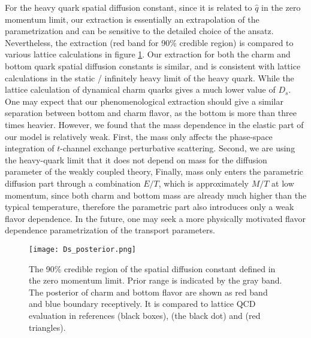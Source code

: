 For the heavy quark spatial diffusion constant, since it is related to $\hat{q}$ in the zero momentum limit, our extraction is essentially an extrapolation of the parametrization and can be sensitive to the detailed choice of the ansatz.
Nevertheless, the extraction (red band for 90\% credible region) is compared to various lattice calculations \cite{Banerjee:2011ra,Ding:2012sp,Francis:2015daa} in  figure \ref{fig:new:posterior-Ds}.
Our extraction for both the charm and bottom quark spatial diffusion constants is similar, and is consistent with lattice calculations in the static / infinitely heavy limit of the heavy quark.
While the lattice calculation of dynamical charm quarks gives a much lower value of $D_s$.
One may expect that our phenomenological extraction should give a similar separation between bottom and charm flavor, as the bottom is more than three times heavier.
However, we found that the mass dependence in the elastic part of our model is relatively weak. 
First, the mass only affects the phase-space integration of $t$-channel exchange perturbative scattering.
Second, we are using the heavy-quark limit that it does not depend on mass for the diffusion parameter of the weakly coupled theory, 
Finally, mass only enters the parametric diffusion part through a combination $E/T$, which is approximately $M/T$ at low momentum, since both charm and bottom mass are already much higher than the typical temperature, therefore the parametric part also introduces only a weak flavor dependence.
In the future, one may seek a more physically motivated flavor dependence parametrization of the transport parameters.

\begin{figure}
\singlespacing
\centering
\texttt{[image: Ds\_posterior.png]}
\caption[The 90\% credible region of the spatial diffusion constant defined]{The 90\% credible region of the spatial diffusion constant defined in the zero momentum limit. Prior range is indicated by the gray band. The posterior of charm and bottom flavor are shown as red band and blue boundary receptively. It is compared to lattice QCD evaluation in references \cite{Banerjee:2011ra} (black boxes), \cite{Francis:2015daa} (the black dot) and \cite{Ding:2012sp} (red triangles).}
\label{fig:new:posterior-Ds}
\end{figure}